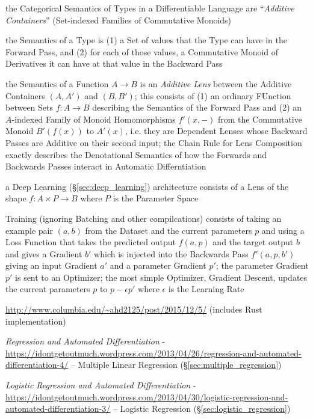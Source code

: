 the Categorical Semantics of Types in a Differentiable Language are
``\emph{Additive Containers}'' (Set-indexed Families of Commutative Monoids)

the Semantics of a Type is (1) a Set of values that the Type can have in the
Forward Pass, and (2) for each of those values, a Commutative Monoid of
Derivatives it can have at that value in the Backward Pass

the Semantics of a Function $A \to B$ is an \emph{Additive Lens} between the
Additive Containers $(A,A')$ and $(B,B')$; this consists of (1) an ordinary
FUnction between Sets $f : A \to B$ describing the Semantics of the Forward Pass
and (2) an $A$-indexed Family of Monoid Homomorphisms $f'(x,-)$ from the
Commutative Monoid $B'(f(x))$ to $A'(x)$, i.e. they are Dependent Lenses whose
Backward Passes are Additive on their second input; the Chain Rule for Lens
Composition exactly describes the Denotational Semantics of how the Forwards and
Backwards Passes interact in Automatic Differntiation

a Deep Learning (\S\ref{sec:deep_learning}) architecture consists of a Lens of
the shape $f : A \times P \to B$ where $P$ is the Parameter Space

Training (ignoring Batching and other compilcations) consists of taking an
example pair $(a,b)$ from the Dataset and the current parameters $p$ and using a
Loss Function that takes the predicted output $f(a,p)$ and the target output $b$
and gives a Gradient $b'$ which is injected into the Backwards Pass $f'(a,p,b')$
giving an input Gradient $a'$ and a parameter Gradient $p'$; the parameter
Gradient $p'$ is sent to an Optimizer; the most simple Optimizer, Gradient
Descent, updates the current parameters $p$ to $p - \epsilon p'$ where
$\epsilon$ is the Learning Rate

\asterism

\url{http://www.columbia.edu/~ahd2125/post/2015/12/5/} (includes Rust
implementation)

\asterism

\emph{Regression and Automated Differentiation} -
\url{https://idontgetoutmuch.wordpress.com/2013/04/26/regression-and-automated-differentiation-4/}
-- Multiple Linear Regression (\S\ref{sec:multiple_regression})

\emph{Logistic Regression and Automated Differentiation} -
\url{https://idontgetoutmuch.wordpress.com/2013/04/30/logistic-regression-and-automated-differentiation-3/}
-- Logistic Regression (\S\ref{sec:logistic_regression})

